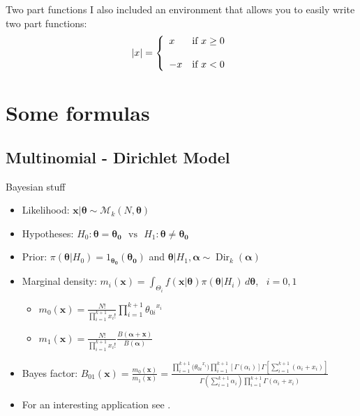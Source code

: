
\begin{frame}{Two part functions}
	I also included an environment that allows you to easily write two part functions:
	$$|x| =\left\{ \begin{array}{ll} x & \mbox{if } x \geq 0 \\ \\ -x & \mbox{if } x < 0 \end{array} \right.$$
\end{frame}

\section{Some formulas}

\subsection{Multinomial - Dirichlet Model}


\begin{frame}{Bayesian stuff}
	\begin{itemize}
	\item Likelihood: $\bm{x}|\bm{\theta} \sim \mathcal{M}_k(N,\bm{\theta})$
	\item Hypotheses:  $ H_0: \bm{\theta}=\bm{\theta_0} \,\,\,\, \text{vs} \,\,\,\,  H_1: \bm{\theta} \neq \bm{\theta_0}$
	\item Prior: $\pi(\bm{\theta}|H_0)={1_{\bm{\theta_0}}(\bm{\theta_0})}$ and $\bm{\theta}|H_1, \bm{\alpha} \sim \operatorname{Dir}_k(\bm{\alpha})$ 
	\item Marginal density: $m_i(\bm{x})=\int_{\Theta_i} f(\bm{x}|\bm{\theta})\pi(\bm{\theta}|H_i) \, d\bm{\theta} $, \, $i=0,1$
		\begin{itemize}
		\item  $m_0(\bm{x})=\frac{N!}{\prod_{i=1}^{k+1}x_i!}\prod_{i=1}^{k+1}{\theta_{0i}}^{x_i}$ 
		\item  $m_1(\bm{x})= \frac{N!}{\prod_{i=1}^{k+1}x_i!}\frac{B(\bm{\alpha}+\bm{x})}{B(\bm{\alpha})}$ 
		\end{itemize}
	\item Bayes factor: $B_{01}(\bm{x}) = \frac{m_0(\bm{x})}{m_1(\bm{x})} = \frac{\prod_{i=1}^{k+1}{(\theta_{0i}}^{x_i}) \prod_{i=1}^{k+1}[\Gamma(\alpha_i)] \Gamma [\sum_{i=1}^{k+1}(\alpha_i+x_i)]}{\Gamma(\sum_{i=1}^{k+1} \alpha_i) \prod_{i=1}^{k+1}\Gamma(\alpha_i+x_i)}$
	\item For an interesting application see \citet{pericchiTorres2011}.
	\end{itemize}
\end{frame}

